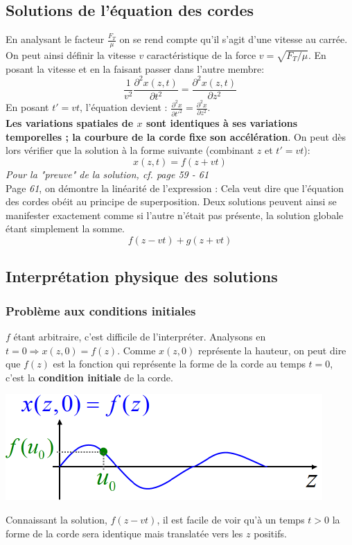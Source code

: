 \documentclass	[11pt, a4paper, openany]{book}
\begin{document}
		\subsection{Solutions de l'équation des cordes}
		En analysant le facteur $\frac{F_T}{\mu}$ on se rend compte qu'il s'agit d'une vitesse au carrée. On peut ainsi définir la vitesse $v$ caractéristique de la force $v = \sqrt{F_T/\mu}$. 
		En posant la vitesse et en la faisant passer dans l'autre membre: 
		\begin{equation}
			\frac{1}{v^2}\frac{\partial^2 x(z, t)}{\partial t^2} = \frac{\partial^2 x(z, t)}{\partial z^2}
		\end{equation}
		En posant $t' = vt$, l'équation devient : $\frac{\partial^2 x}{\partial t'^2} = \frac{\partial^2 x}{\partial z^2}$.\\
		\textbf{Les variations spatiales de $x$ sont identiques à ses variations temporelles ; la courbure de la corde fixe son accélération}. On peut dès lors vérifier que la solution à la forme suivante (combinant $z$ et $t' = vt$): 
		\begin{equation}
			x(z,t) = f(z + vt)
		\end{equation}
		\textit{Pour la "preuve" de la solution, cf. page 59 - 61}\\
		Page \textit{61}, on démontre la linéarité de l'expression : Cela veut dire que l'équation des cordes obéit au principe de superposition. Deux solutions peuvent ainsi se manifester exactement comme si l'autre n'était pas présente, la solution globale étant simplement la somme.
		\begin{equation}
			f(z-vt) + g(z+vt)
		\end{equation}
		
		\subsection{Interprétation physique des solutions}
		\subsubsection{Problème aux conditions initiales}
		$f$ étant arbitraire, c'est difficile de l'interpréter. Analysons en $t = 0 \Rightarrow x(z, 0) = f(z)$. Comme $x(z, 0)$ représente la hauteur, on peut dire que $f(z)$ est la fonction qui représente la forme de la corde au temps $t = 0$, c'est la \textbf{condition initiale} de la corde.
		\begin{center}
			\includegraphics[scale=0.55]{oo/image25.png}
		\end{center}
		Connaissant la solution, $f(z - vt)$, il est facile de voir qu'à un temps $t > 0$ la forme de la corde sera identique mais translatée vers les $z$ positifs.\\
		
\end{document}
